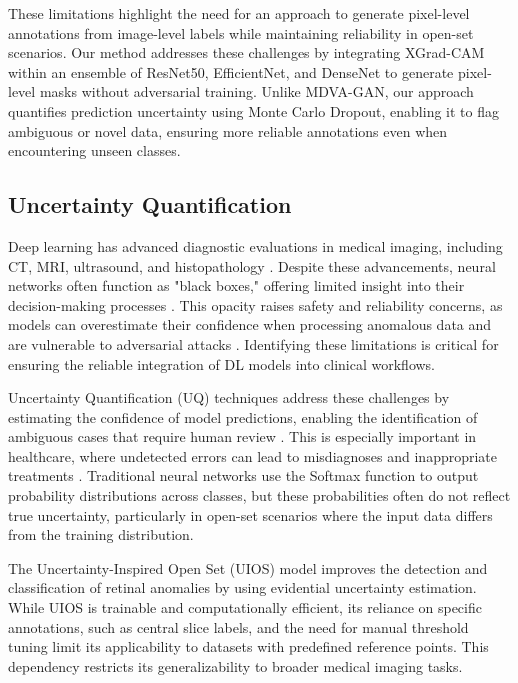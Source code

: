 These limitations highlight the need for an approach to generate pixel-level annotations from image-level labels while maintaining reliability in open-set scenarios. Our method addresses these challenges by integrating XGrad-CAM within an ensemble of ResNet50, EfficientNet, and DenseNet to generate pixel-level masks without adversarial training. Unlike MDVA-GAN, our approach quantifies prediction uncertainty using Monte Carlo Dropout, enabling it to flag ambiguous or novel data, ensuring more reliable annotations even when encountering unseen classes.

\subsection{Uncertainty Quantification}

Deep learning has advanced diagnostic evaluations in medical imaging, including CT, MRI, ultrasound, and histopathology \cite{ref31}. Despite these advancements, neural networks often function as "black boxes," offering limited insight into their decision-making processes \cite{ref32}. This opacity raises safety and reliability concerns, as models can overestimate their confidence when processing anomalous data \cite{ref33} and are vulnerable to adversarial attacks \cite{ref34}. Identifying these limitations is critical for ensuring the reliable integration of DL models into clinical workflows.

Uncertainty Quantification (UQ) techniques address these challenges by estimating the confidence of model predictions, enabling the identification of ambiguous cases that require human review \cite{ref36}. This is especially important in healthcare, where undetected errors can lead to misdiagnoses and inappropriate treatments \cite{ref37}. Traditional neural networks use the Softmax function to output probability distributions across classes, but these probabilities often do not reflect true uncertainty, particularly in open-set scenarios where the input data differs from the training distribution.

The Uncertainty-Inspired Open Set (UIOS) model \cite{ref38} improves the detection and classification of retinal anomalies by using evidential uncertainty estimation. While UIOS is trainable and computationally efficient, its reliance on specific annotations, such as central slice labels, and the need for manual threshold tuning limit its applicability to datasets with predefined reference points. This dependency restricts its generalizability to broader medical imaging tasks.

